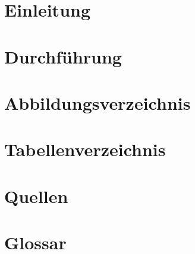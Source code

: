 \documentclass[11pt]{article}
\begin{document}
    
    \pagebreak
    \tableofcontents
    \pagebreak
    \section{Einleitung}
    
    \pagebreak
    \section{Durchführung}
    
    \pagebreak
    \section{Abbildungsverzeichnis}
    
    \pagebreak
    \section{Tabellenverzeichnis}
    \listoftables
    \pagebreak
    \section{Quellen}
    
    \pagebreak
    \section{Glossar}
    
\end{document}
